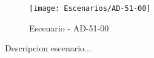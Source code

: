 \begin{figure}[H]
\centering
\texttt{[image: Escenarios/AD-51-00]}
\caption{Escenario - AD-51-00}
\label{fig:AD-51-00}
\end{figure}

Descripcion escenario...
\clearpage
